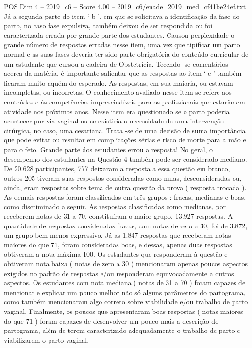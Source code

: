 \begin{textsample}{POS Dim 4 – 2019\_c6 – Score 4.00 – 2019\_c6/enade\_2019\_med\_cf41be24ef.txt}
Já a segunda parte do item ‘ b ’, em que se solicitava a identificação da fase do parto, no caso fase expulsiva, também deixou de ser respondida ou foi caracterizada errada por grande parte dos estudantes.
Causou perplexidade o grande número de respostas erradas nesse item, uma vez que tipificar um parto normal e as suas fases deveria ter sido parte obrigatória do conteúdo curricular de um estudante que cursou a cadeira de Obstetrícia.
Tecendo -se comentários acerca da matéria, é importante salientar que as respostas ao item ‘ c ’ também ficaram muito aquém do esperado.
As respostas, em sua maioria, ou estavam incompletas, ou incorretas.
O conhecimento avaliado nesse item se refere aos conteúdos e às competências imprescindíveis para os profissionais que estarão em atividade nos próximos anos.
Nesse item era questionado se o parto poderia acontecer por via vaginal ou se existiria a necessidade de uma intervenção cirúrgica, no caso, uma cesariana.
Trata -se de uma decisão de suma importância que pode evitar ou resultar em complicações sérias e risco de morte para a mão e para o feto.
Grande parte dos estudantes errou a resposta!
No geral, o desempenho dos estudantes na Questão 4 também pode ser considerado mediano.
De 20.628 participantes, 777 deixaram a resposta a essa questão em branco, outros 205 tiveram suas respostas consideradas como nulas, desconsideradas ou, ainda, eram respostas sobre tema de outra questão da prova ( resposta trocada ).
As demais respostas foram classificadas em três grupos : fracas, medianas e boas, como discriminado a seguir.
As respostas classificadas como medianas, por receberem notas de 31 a 70, constituíram o maior grupo, 13.927 respostas.
A quantidade de respostas consideradas fracas, com notas de zero a 30, foi de 3.872, um grupo bem menos expressivo.
Já as 1.847 respostas que receberam notas maiores do que 71, foram consideradas boas, e dessas, apenas duas respostas obtiveram a nota máxima 100.
Os estudantes que responderam à questão e obtiveram nota baixa ( notas de zero a 30 ) mencionaram apenas poucos aspectos exigidos no padrão de respostas e/ou responderam equivocadamente a outros aspectos.
Os estudantes com nota mediana ( notas de 31 a 70 ) foram capazes de mencionar e explicar um pouco melhor não só alguns parâmetros do partograma, como também mencionaram algo correto sobre viabilidade e/ou trabalho de parto vaginal.
Finalmente, os poucos que apresentaram boas respostas ( notas maiores do que 71 ) foram capazes de desenvolver um pouco mais a descrição do partograma, além de terem caracterizado adequadamente o trabalho de parto e viabilizarem o parto vaginal.

\end{textsample}
